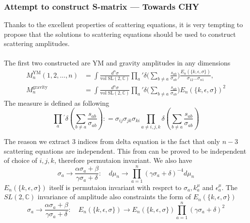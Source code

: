\documentclass{beamer}
\begin{document}
\begin{frame}
    \frametitle{Attempt to construct S-matrix --- Towards CHY}
    Thanks to the excellent properties of scattering equations, it is very tempting to propose that the solutions
    to scattering equations should be used to construct scattering amplitudes.
    \\ \hspace*{\fill}\\
    The first two constructed are YM and gravity amplitudes in any dimensions
    \begin{align*}
        M_n^{\mathrm{YM}}(1,2,\dots,n)&=\int\frac{d^n\sigma}{\text{vol SL}(2,\mathbb{C})}\prod_a{'}\delta\bigg(\sum_{b\neq a}\frac{s_{ab}}{\sigma_{ab}}\bigg)\frac{E_n(\{k,\epsilon,\sigma\})}{\sigma_{12}\dots\sigma_{n1}},\\
        M_n^{\mathrm{gravity}}&=\int\frac{d^n\sigma}{\text{vol SL}(2,\mathbb{C})}\prod_a{'}\delta\bigg(\sum_{b\neq a}\frac{s_{ab}}{\sigma_{ab}}\bigg)E_n(\{k,\epsilon,\sigma\})^2
    \end{align*}
    The measure is defined as following
    \begin{equation*}
        \prod_{a}{}^{\prime}\delta{\left(\sum_{b\neq a}\frac{s_{ab}}{\sigma_{ab}}\right)}{:}=\sigma_{ij}\sigma_{jk}\sigma_{ki}\prod_{a\neq i,j,k}\delta{\left(\sum_{b\neq a}\frac{s_{ab}}{\sigma_{ab}}\right)}
    \end{equation*}
\end{frame}
\begin{frame}
    The reason we extract 3 indices from delta equation is the fact that only $n-3$ scattering equations are independent.
    This from can be proved to be \alert{independent of choice of $i,j,k$}, therefore permutaion invariant.
    We also have
    \begin{equation*}
        \sigma_a\to\frac{\alpha\sigma_a+\beta}{\gamma\sigma_a+\delta}:\quad d\mu_n\to\prod_{a=1}^n(\gamma\sigma_a+\delta)^{-4}d\mu_n
    \end{equation*}
    $E_n(\{k,\epsilon,\sigma\})$ itself is permutaion invariant with resprct to $\sigma_a,k_a^\mu$ and $\epsilon_a^\mu$. The $SL(2,\mathbb{C})$ invariance of amplitude also 
    constraints the form of $E_n(\{k,\epsilon,\sigma\})$
    \begin{equation*}
        \sigma_a\to\frac{\alpha\sigma_a+\beta}{\gamma\sigma_a+\delta}:\quad E_n(\{k,\epsilon,\sigma\})\to E_n(\{k,\epsilon,\sigma\})\prod_{a=1}^n(\gamma\sigma_a+\delta)^2
    \end{equation*}
\end{frame}
\end{document}
